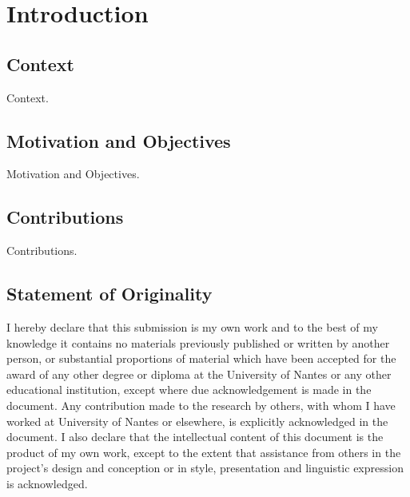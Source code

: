 
\chapter{Introduction}

\section{Context}

Context.

\section{Motivation and Objectives}

Motivation and Objectives.

\section{Contributions}

Contributions.

\section{Statement of Originality}

I hereby declare that this submission is my own work and to the best of my knowledge it contains no materials previously published or written by another person, or substantial proportions of material which have been accepted for the award of any other degree or diploma at the University of Nantes or any other educational institution, except where due acknowledgement is made in the document. Any contribution made to the research by others, with whom I have worked at University of Nantes or elsewhere, is explicitly acknowledged in the document. I also declare that the intellectual content of this document is the product of my own work, except to the extent that assistance from others in the project's design and conception or in style, presentation and linguistic expression is acknowledged.

